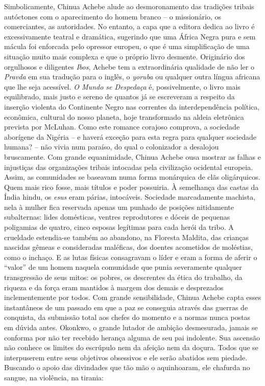 \documentclass[
  letterpaper,
  DIV=11,
  numbers=noendperiod]{scrreprt}
\begin{document}
Simbolicamente, Chinua Achebe alude ao desmoronamento das tradições
tribais autóctones com o aparecimento do homem branco -- o missionário,
os comerciantes, as autoridades. No entanto, a capa que a editora dedica
ao livro é excessivamente teatral e dramática, sugerindo que uma África
Negra pura e sem mácula foi enforcada pelo opressor europeu, o que é uma
simplificação de uma situação muito mais complexa e que o próprio livro
desmente. Originário dos orgulhosos e diligentes \emph{Ibos}, Achebe tem
a extraordinária qualidade de não ler o \emph{Pravda} em sua tradução
para o inglês, o \emph{yoruba} ou qualquer outra língua africana que lhe
seja acessível. \emph{O Mundo se Despedaça} é, possivelmente, o livro
mais equilibrado, mais justo e sereno de quantos já se escreveram a
respeito da inserção violenta do Continente Negro nas correntes da
interdependência política, econômica, cultural do nosso planeta, hoje
transformado na aldeia eletrônica prevista por McLuhan. Como este
romance corajoso comprova, a sociedade aborígene da Nigéria -- e haverá
exceção para esta regra para qualquer sociedade humana? -- não vivia num
paraíso, do qual o colonizador a desalojou bruscamente. Com grande
equanimidade, Chinua Achebe ousa mostrar as falhas e injustiças das
organizações tribais intocadas pela civilização ocidental europeia.
Assim, as comunidades se baseavam numa forma monárquica de clãs
oligárquicos. Quem mais rico fosse, mais títulos e poder possuiria. À
semelhança das castas da Índia hindu, os \emph{esus} eram párias,
intocáveis. Sociedade marcadamente machista, nela à mulher fica
reservada apenas um punhado de posições nitidamente subalternas: lides
domésticas, ventres reprodutores e dóceis de pequenas poligamias de
quatro, cinco esposas legítimas para cada herói da tribo. A crueldade
estendia-se também ao abandono, na Floresta Maldita, das crianças
nascidas gêmeas e consideradas maléficas, dos doentes acometidos de
moléstias, como o inchaço. E as lutas físicas consagravam o líder e eram
a forma de aferir o ``valor'' de um homem naquela comunidade que punia
severamente qualquer transgressão de seus mitos: os pobres, os
descrentes da ética do trabalho, da riqueza e da força eram mantidos à
margem dos demais e desprezados inclementemente por todos. Com grande
sensibilidade, Chinua Achebe capta esses instantâneos de um passado em
que a paz se conseguia através das guerras de conquista, da submissão
total aos chefes do momento e a normas nunca postas em dúvida antes.
Okonkwo, o grande lutador de ambição desmesurada, jamais se conforma por
não ter recebido herança alguma de seu pai indolente. Sua ascensão não
conhece os limites do escrúpulo nem da afeição nem da doçura. Todos que
se interpuserem entre seus objetivos obsessivos e ele serão abatidos sem
piedade. Buscando o apoio das divindades que tão mão o aquinhoaram, ele
chafurda no sangue, na violência, na tirania:
\end{document}
